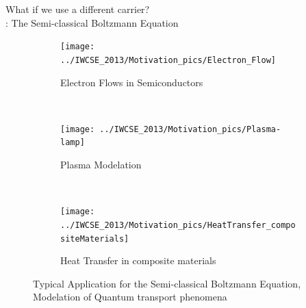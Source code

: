 \begin{frame}
 What if we use a different carrier? \\ : The Semi-classical Boltzmann Equation
  \begin{figure}
        \centering
        \begin{subfigure}[b]{0.30\textwidth}
                \centering
                \texttt{[image: ../IWCSE\_2013/Motivation\_pics/Electron\_Flow]}
                \caption{Electron Flows in Semiconductors}
                \label{fig:Electron_Flow}
        \end{subfigure}
        ~ %
        \begin{subfigure}[b]{0.30\textwidth}
                \centering
                \texttt{[image: ../IWCSE\_2013/Motivation\_pics/Plasma-lamp]}
                \caption{Plasma Modelation}
                \label{fig:Plasma_lamp}
        \end{subfigure}
        ~ %
        \begin{subfigure}[b]{0.30\textwidth}
                \centering
                \texttt{[image: ../IWCSE\_2013/Motivation\_pics/HeatTransfer\_compositeMaterials]}
                \caption{Heat Transfer in composite materials}
                \label{fig:HeatTransfer_compositeMaterials}
        \end{subfigure}
        \caption{Typical Application for the Semi-classical Boltzmann Equation, Modelation of Quantum transport phenomena}
	\label{fig:Semiclassical_Applications}
 \end{figure}
\end{frame}